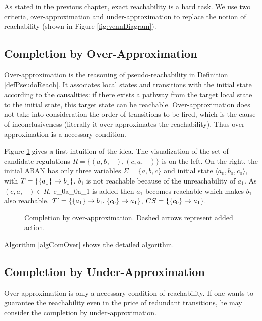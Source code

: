As stated in the previous chapter, exact reachability is a hard task.
We use two criteria, over-approximation and under-approximation to replace the notion of reachability (shown in Figure \ref{fig:vennDiagram}).


\subsection{Completion by Over-Approximation}
Over-approximation is the reasoning of pseudo-reachability in Definition \ref{defPseudoReach}. 
It associates local states and transitions with the initial state according to the causalities: if there exists a pathway from the target local state to the initial state, this target state can be reachable.
Over-approximation does not take into consideration the order of transitions to be fired, which is the cause of inconclusiveness (literally it over-approximates the reachability).
Thus over-approximation is a necessary condition.

Figure \ref{CompOv} gives a first intuition of the idea.
The visualization of the set of candidate regulations $R=\{(a,b,+),(c,a,-)\}$ is on the left.
On the right, the initial ABAN has only three variables $\Sigma=\{a,b,c\}$ and initial state $\langle a_0,b_0,c_0\rangle$, with $T=\{\acm{a_1}{b_0}{b_1}\}$.
$b_1$ is not reachable because of the unreachability of $a_1$.
As $(c,a,-)\in R$, \ac{c_0}{a_0}{a_1} is added then $a_1$ becomes reachable which makes $b_1$ also reachable.
$T'=\{\acm{a_1}{b_0}{b_1},\acm{c_0}{a_0}{a_1}\}$, $CS=\{\acm{c_0}{a_0}{a_1}\}$.

\begin{figure}[ht]
\centering

\caption[Completion by over-approximation]{Completion by over-approximation. Dashed arrows represent added action.}\label{CompOv}
\end{figure}
Algorithm \ref{algComOver} shows the detailed algorithm.

\subsection{Completion by Under-Approximation}
Over-approximation is only a necessary condition of reachability.
If one wants to guarantee the reachability even in the price of redundant transitions, he may consider the completion by under-approximation.

